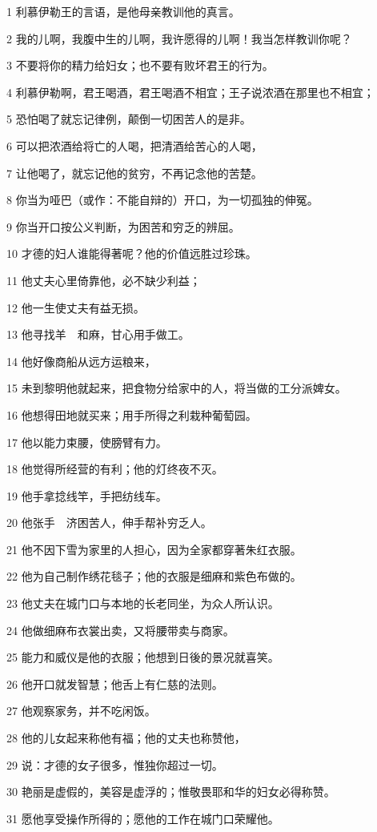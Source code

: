 \par 1 利慕伊勒王的言语，是他母亲教训他的真言。
\par 2 我的儿啊，我腹中生的儿啊，我许愿得的儿啊！我当怎样教训你呢？
\par 3 不要将你的精力给妇女；也不要有败坏君王的行为。
\par 4 利慕伊勒啊，君王喝酒，君王喝酒不相宜；王子说浓酒在那里也不相宜；
\par 5 恐怕喝了就忘记律例，颠倒一切困苦人的是非。
\par 6 可以把浓酒给将亡的人喝，把清酒给苦心的人喝，
\par 7 让他喝了，就忘记他的贫穷，不再记念他的苦楚。
\par 8 你当为哑巴（或作：不能自辩的）开口，为一切孤独的伸冤。
\par 9 你当开口按公义判断，为困苦和穷乏的辨屈。
\par 10 才德的妇人谁能得著呢？他的价值远胜过珍珠。
\par 11 他丈夫心里倚靠他，必不缺少利益；
\par 12 他一生使丈夫有益无损。
\par 13 他寻找羊　和麻，甘心用手做工。
\par 14 他好像商船从远方运粮来，
\par 15 未到黎明他就起来，把食物分给家中的人，将当做的工分派婢女。
\par 16 他想得田地就买来；用手所得之利栽种葡萄园。
\par 17 他以能力束腰，使膀臂有力。
\par 18 他觉得所经营的有利；他的灯终夜不灭。
\par 19 他手拿捻线竿，手把纺线车。
\par 20 他张手　济困苦人，伸手帮补穷乏人。
\par 21 他不因下雪为家里的人担心，因为全家都穿著朱红衣服。
\par 22 他为自己制作绣花毯子；他的衣服是细麻和紫色布做的。
\par 23 他丈夫在城门口与本地的长老同坐，为众人所认识。
\par 24 他做细麻布衣裳出卖，又将腰带卖与商家。
\par 25 能力和威仪是他的衣服；他想到日後的景况就喜笑。
\par 26 他开口就发智慧；他舌上有仁慈的法则。
\par 27 他观察家务，并不吃闲饭。
\par 28 他的儿女起来称他有福；他的丈夫也称赞他，
\par 29 说：才德的女子很多，惟独你超过一切。
\par 30 艳丽是虚假的，美容是虚浮的；惟敬畏耶和华的妇女必得称赞。
\par 31 愿他享受操作所得的；愿他的工作在城门口荣耀他。


